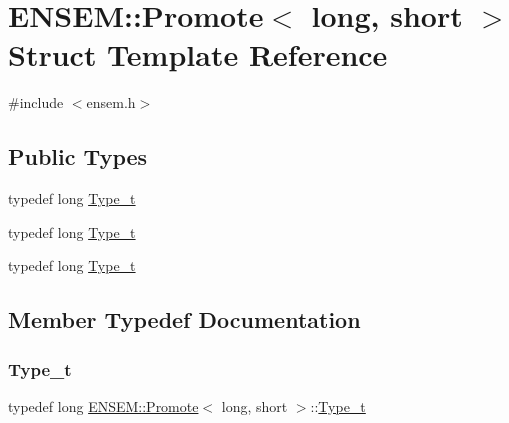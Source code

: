 \hypertarget{structENSEM_1_1Promote_3_01long_00_01short_01_4}{}\section{E\+N\+S\+EM\+:\+:Promote$<$ long, short $>$ Struct Template Reference}
\label{structENSEM_1_1Promote_3_01long_00_01short_01_4}


{\ttfamily \#include $<$ensem.\+h$>$}

\subsection*{Public Types}
\begin{DoxyCompactItemize}
\item 
typedef long \mbox{\hyperlink{structENSEM_1_1Promote_3_01long_00_01short_01_4_ad4dfbe27e4b99b58da27d3d26440cb0c}{Type\+\_\+t}}
\item 
typedef long \mbox{\hyperlink{structENSEM_1_1Promote_3_01long_00_01short_01_4_ad4dfbe27e4b99b58da27d3d26440cb0c}{Type\+\_\+t}}
\item 
typedef long \mbox{\hyperlink{structENSEM_1_1Promote_3_01long_00_01short_01_4_ad4dfbe27e4b99b58da27d3d26440cb0c}{Type\+\_\+t}}
\end{DoxyCompactItemize}


\subsection{Member Typedef Documentation}
\mbox{\label{structENSEM_1_1Promote_3_01long_00_01short_01_4_ad4dfbe27e4b99b58da27d3d26440cb0c}} 
\subsubsection{\texorpdfstring{Type\_t}{Type\_t}\hspace{0.1cm}{\footnotesize\ttfamily [1/3]}}
{\footnotesize\ttfamily typedef long \mbox{\hyperlink{structENSEM_1_1Promote}{E\+N\+S\+E\+M\+::\+Promote}}$<$ long, short $>$\+::\mbox{\hyperlink{structENSEM_1_1Promote_3_01long_00_01short_01_4_ad4dfbe27e4b99b58da27d3d26440cb0c}{Type\+\_\+t}}}

